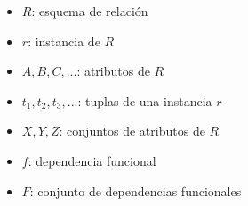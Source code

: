 \documentclass[preview]{standalone}
\begin{document}
\begin{itemize}
\item $R$: esquema de relaci\'on
\item $r$: instancia de $R$
\item $A, B, C, ...$: atributos de $R$
\item $t_1, t_2, t_3, ...$: tuplas de una instancia $r$ 
\item $X, Y, Z$: conjuntos de atributos de $R$
\item $f$: dependencia funcional
\item $F$: conjunto de dependencias funcionales
\end{itemize}
\end{document}
